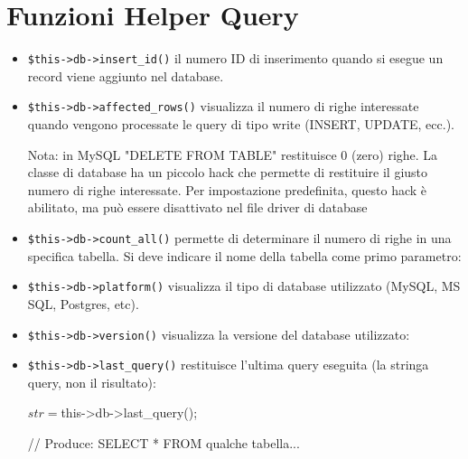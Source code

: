 \section*{Funzioni Helper Query}

\begin{itemize}
\item \verb|$this->db->insert_id()| il numero ID di inserimento quando si esegue un record viene aggiunto nel database.

\item \verb|$this->db->affected_rows()| visualizza il numero di righe interessate quando vengono processate le query di tipo  write (INSERT, UPDATE, ecc.).

Nota: in MySQL "DELETE FROM TABLE" restituisce 0 (zero) righe. La classe di database ha un piccolo hack che permette di restituire il giusto numero di righe interessate. Per impostazione predefinita, questo hack è abilitato, ma può essere disattivato nel file driver di database

\item \verb|$this->db->count_all()| permette di determinare il numero di righe in una specifica tabella. Si deve indicare il nome della tabella come primo parametro:


\item \verb|$this->db->platform()| visualizza il tipo di database utilizzato (MySQL, MS SQL, Postgres, etc).


\item \verb|$this->db->version()| visualizza la versione del database utilizzato:


\item \verb|$this->db->last_query()| restituisce l'ultima query eseguita (la stringa query, non il risultato):

\begin{code}
$str = $this->db->last_query();

// Produce: SELECT * FROM qualche tabella...
\end{code}


\end{itemize}
